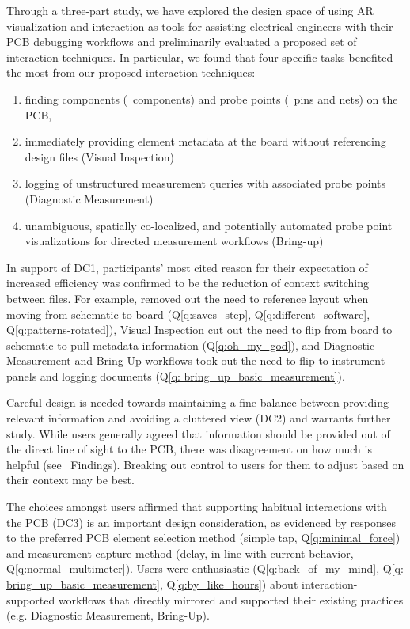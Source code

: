 \documentclass [11pt, proquest] {uwthesis}[2020/02/24]
\newcounter{sharc}
\newcommand{\sharcref}[1]{Q\ref{#1}} %
\begin{document}
Through a three-part study, we have explored the design space of using AR visualization and interaction as tools for assisting electrical engineers with their PCB debugging workflows and preliminarily evaluated a proposed set of interaction techniques.
In particular, we found that four specific tasks benefited the most from our proposed interaction techniques:
\begin{enumerate}
\item finding components (\ElemLocOnPCB\ components) and probe points (\ElemLocOnPCB\ pins and nets) on the PCB,
\item immediately providing element metadata at the board without referencing design files (Visual Inspection)
\item logging of unstructured measurement queries with associated probe points (Diagnostic Measurement)
\item unambiguous, spatially co-localized, and potentially automated probe point visualizations for directed measurement workflows (Bring-up)
\end{enumerate}

In support of DC1, participants' most cited reason for their expectation of increased efficiency was confirmed to be the reduction of context switching between files. For example, \ElemLocOnPCB removed out the need to reference layout when moving from schematic to board (\sharcref{q:saves_step}, \sharcref{q:different_software}, \sharcref{q:patterns-rotated}), Visual Inspection cut out the need to flip from board to schematic to pull metadata information (\sharcref{q:oh_my_god}), and Diagnostic Measurement and Bring-Up workflows took out the need to flip to instrument panels and logging documents (\sharcref{q: bring_up_basic_measurement}).

Careful design is needed towards maintaining a fine balance between providing relevant information and avoiding a cluttered view (DC2) and warrants further study. While users generally agreed that information should be provided out of the direct line of sight to the PCB, there was disagreement on how much is helpful (see \MetaDataOnPCB\ Findings). Breaking out control to users for them to adjust based on their context may be best.

The choices amongst users affirmed that supporting habitual interactions with the PCB (DC3) is an important design consideration, as evidenced by responses to the preferred PCB element selection method (simple tap, \sharcref{q:minimal_force}) and measurement capture method (delay, in line with current behavior, \sharcref{q:normal_multimeter}). Users were enthusiastic (\sharcref{q:back_of_my_mind}, \sharcref{q: bring_up_basic_measurement}, \sharcref{q:by_like_hours}) about interaction-supported workflows that directly mirrored and supported their existing practices (e.g. Diagnostic Measurement, Bring-Up).
\end{document}

